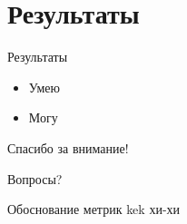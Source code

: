 \documentclass[russian, hyperref={unicode}]{beamer}
\begin{document}
\section{Результаты}

\begin{frame}{Результаты}
    \begin{itemize}
        \item Умею
        \item Могу
    \end{itemize}
\end{frame}

\begin{frame}{Спасибо за внимание!}
    \begin{center}
        \Huge
        {\color{blue} Вопросы?}
    \end{center}
\end{frame}

\appendix

\begin{frame}[noframenumbering, t]{Обоснование метрик}
     {
      kek
    }
     {
      хи-хи
    }
\end{frame}
\end{document}
